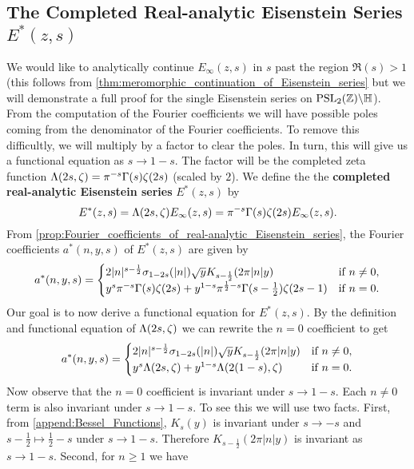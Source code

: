     \subsection*{The Completed Real-analytic Eisenstein Series \texorpdfstring{$E^{\ast}(z,s)$}{E^{\ast}(z,s)}}
      We would like to analytically continue $E_{\infty}(z,s)$ in $s$ past the region $\Re(s) > 1$ (this follows from \cref{thm:meromorphic_continuation_of_Eisenstein_series} but we will demonstrate a full proof for the single Eisenstein series on $\mathrm{PSL}_{2}(\mathbb{Z})\backslash\mathbb{H}$). From the computation of the Fourier coefficients we will have possible poles coming from the denominator of the Fourier coefficients. To remove this difficultly, we will multiply by a factor to clear the poles. In turn, this will give us a functional equation as $s \to 1-s$. The factor will be the completed zeta function $\Lambda(2s,\zeta) = \pi^{-s}\Gamma(s)\zeta(2s)$ (scaled by $2$). We define the the \textbf{completed real-analytic Eisenstein series} $E^{\ast}(z,s)$ by
      \[
        E^{\ast}(z,s) = \Lambda(2s,\zeta)E_{\infty}(z,s) = \pi^{-s}\Gamma(s)\zeta(2s)E_{\infty}(z,s).
      \]
      From \cref{prop:Fourier_coefficients_of_real-analytic_Eisenstein_series}, the Fourier coefficients $a^{\ast}(n,y,s)$ of $E^{\ast}(z,s)$ are given by
      \[
        a^{\ast}(n,y,s) = \begin{cases} 2|n|^{s-\frac{1}{2}}\sigma_{1-2s}(|n|)\sqrt{y}K_{s-\frac{1}{2}}(2\pi|n|y) & \text{if $n \neq 0$}, \\ y^{s}\pi^{-s}\Gamma(s)\zeta(2s)+y^{1-s}\pi^{\frac{1}{2}-s}\Gamma(s-\frac{1}{2})\zeta(2s-1) & \text{if $n = 0$}. \end{cases}
      \]
      Our goal is to now derive a functional equation for $E^{\ast}(z,s)$. By the definition and functional equation of $\Lambda(2s,\zeta)$ we can rewrite the $n = 0$ coefficient to get
      \begin{equation}\label{equ:Fourier_coefficients_for_completed_real-analytic_Eisenstein_series}
        a^{\ast}(n,y,s) = \begin{cases} 2|n|^{s-\frac{1}{2}}\sigma_{1-2s}(|n|)\sqrt{y}K_{s-\frac{1}{2}}(2\pi|n|y) & \text{if $n \neq 0$}, \\ y^{s}\Lambda(2s,\zeta)+y^{1-s}\Lambda(2(1-s),\zeta) & \text{if $n = 0$}. \end{cases}
      \end{equation}
      Now observe that the $n = 0$ coefficient is invariant under $s \to 1-s$. Each $n \neq 0$ term is also invariant under $s \to 1-s$. To see this we will use two facts. First, from \cref{append:Bessel_Functions}, $K_{s}(y)$ is invariant under $s \to -s$ and $s-\frac{1}{2} \mapsto \frac{1}{2}-s$ under $s \to 1-s$. Therefore $K_{s-\frac{1}{2}}(2\pi|n|y)$ is invariant as $s \to 1-s$. Second, for $n \ge 1$ we have
